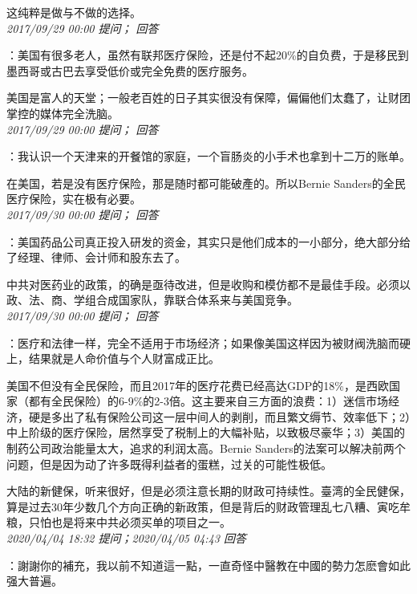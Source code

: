 \documentclass[twocolumn]{ctexart}
\begin{document}
这纯粹是做与不做的选择。\\

\textit{\hfill\noindent\small 2017/09/29 00:00 提问； 回答}

：美国有很多老人，虽然有联邦医疗保险，还是付不起20\%的自负费，于是移民到墨西哥或古巴去享受低价或完全免费的医疗服务。

美国是富人的天堂；一般老百姓的日子其实很没有保障，偏偏他们太蠢了，让财团掌控的媒体完全洗脑。\\

\textit{\hfill\noindent\small 2017/09/29 00:00 提问； 回答}

：我认识一个天津来的开餐馆的家庭，一个盲肠炎的小手术也拿到十二万的账单。

在美国，若是没有医疗保险，那是随时都可能破產的。所以Bernie Sanders的全民医疗保险，实在极有必要。\\

\textit{\hfill\noindent\small 2017/09/30 00:00 提问； 回答}

：美国药品公司真正投入研发的资金，其实只是他们成本的一小部分，绝大部分给了经理、律师、会计师和股东去了。

中共对医药业的政策，的确是亟待改进，但是收购和模仿都不是最佳手段。必须以政、法、商、学组合成国家队，靠联合体系来与美国竞争。\\

\textit{\hfill\noindent\small 2017/09/30 00:00 提问； 回答}

：医疗和法律一样，完全不适用于市场经济；如果像美国这样因为被财阀洗脑而硬上，结果就是人命价值与个人财富成正比。

美国不但没有全民保险，而且2017年的医疗花费已经高达GDP的18\%，是西欧国家（都有全民保险）的6-9\%的2-3倍。这主要来自三方面的浪费：1）迷信市场经济，硬是多出了私有保险公司这一层中间人的剥削，而且繁文缛节、效率低下；2）中上阶级的医疗保险，居然享受了税制上的大幅补贴，以致极尽豪华；3）美国的制药公司政治能量太大，追求的利润太高。Bernie Sanders的法案可以解决前两个问题，但是因为动了许多既得利益者的蛋糕，过关的可能性极低。

大陆的新健保，听来很好，但是必须注意长期的财政可持续性。臺湾的全民健保，算是过去30年少数几个方向正确的新政策，但是背后的财政管理乱七八糟、寅吃牟粮，只怕也是将来中共必须买单的项目之一。\\

\textit{\hfill\noindent\small 2020/04/04 18:32 提问；2020/04/05 04:43 回答}

：謝謝你的補充，我以前不知道這一點，一直奇怪中醫教在中國的勢力怎麽會如此强大普遍。
\end{document}
